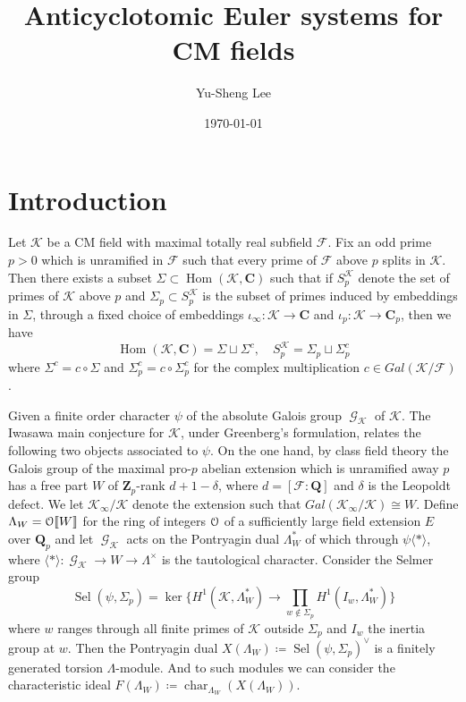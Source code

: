 \documentclass[leqno]{amsart}
\theoremstyle{definition}
\theoremstyle{remark}
\newcommand{\eo}{\EuScript{O}}
\newcommand{\Q}{{\mathbf{Q}}}
\newcommand{\Qp}{\mathbf{Q}_p}
\newcommand{\Zp}{\mathbf{Z}_p}
\newcommand{\C}{\mathbf C}
\DeclareMathOperator{\Hom}{Hom}
\DeclareMathOperator{\Gal}{\mathcal{G}}
\newcommand{\F}{{\mathcal{F}}} %
\newcommand{\K}{{\mathcal{K}}} %
\DeclareMathOperator{\Sel}{Sel}
\DeclareMathOperator{\car}{char}
\begin{document}
\title{Anticyclotomic Euler systems for CM fields}
\author[Y-S.~Lee]{Yu-Sheng Lee}
\address{Department of Mathematics, University  of Michigan, Ann Arbor, MI 48109, USA}
\date{\today}

\maketitle
\setcounter{tocdepth}{1}
\tableofcontents

\section*{Introduction}

Let $\K$ be a CM field with maximal totally real subfield $\F$.
Fix an odd prime $p>0$ which is unramified in $\F$
such that every prime of $\F$ above $p$ splits in $\K$.
Then there exists a subset $\Sigma\subset \Hom(\K,\C)$
such that if $S_p^\K$ denote the set of primes of $\K$ above $p$
and $\Sigma_p\subset S_p^\K$ is the subset of primes
induced by embeddings in $\Sigma$,
through a fixed choice of embeddings
$\iota_\infty\colon \K\to \C$ and
$\iota_p\colon \K\to \C_p$, then we have
\[
    \Hom(\K,\C)=\Sigma\sqcup \Sigma^c,\quad
    S_p^\K=\Sigma_p\sqcup \Sigma_p^c
\]
where $\Sigma^c=c\circ \Sigma$ and $\Sigma_p^c=c\circ \Sigma_p^c$
for the complex multiplication $c\in Gal(\K/\F)$.

Given a finite order character $\psi$
of the absolute Galois group $\Gal_\K$ of $\K$.
The Iwasawa main conjecture for $\K$,
under Greenberg's formulation,
relates the following two objects associated to $\psi$.
On the one hand, 
by class field theory the Galois group of
the maximal pro-$p$ abelian extension which is unramified 
away $p$ has a free part $W$ of $\Zp$-rank $d+1-\delta$,
where $d=[\F:\Q]$ and $\delta$ is the Leopoldt defect.
We let $\K_\infty/\K$ denote the extension such that 
$Gal(\K_\infty/\K)\cong W$.
Define $\Lambda_W=\eo\llbracket W\rrbracket$
for the ring of integers $\eo$ of a sufficiently large
field extension $E$ over $\Qp$
and let $\Gal_\K$ acts on 
the Pontryagin dual $\Lambda_W^*$ of which through
$\psi\langle*\rangle$, where 
$\langle*\rangle\colon \Gal_\K\to W\to \Lambda^\times$
is the tautological character. 
Consider the Selmer group
\[
    \Sel(\psi,\Sigma_p)=\ker
    \big\{
    H^1(\K, \Lambda_W^*)\to \prod_{w\notin \Sigma_p}
    H^1(I_w, \Lambda_W^*)
    \big\}
\]
where $w$ ranges through all finite primes of $\K$
outside $\Sigma_p$
and $I_w$ the inertia group at $w$.
Then the Pontryagin dual 
$X(\Lambda_W)\coloneqq \Sel(\psi,\Sigma_p)^\vee$
is a finitely generated torsion $\Lambda$-module.
And to such modules we can consider the characteristic ideal
$F(\Lambda_W)\coloneqq \car_{\Lambda_W}(X(\Lambda_W))$.
\end{document}
